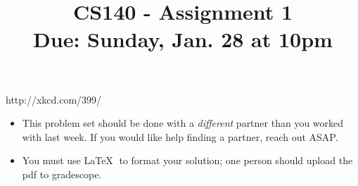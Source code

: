 \documentclass[11pt]{article}
\title{CS140 - Assignment 1\\\small{Due: Sunday,  Jan. 28 at  10pm}}
\author{}
\date{}
\begin{document}
\maketitle

\begin{center}

\footnotesize{http://xkcd.com/399/}
\end{center}


\begin{itemize}
\item[] This problem set should be done with a \emph{different} partner than you worked with last week.  If you would like help finding a partner, reach out ASAP.
\item[] You must use \LaTeX $\;$ to format your solution; one person should upload the pdf to gradescope.
\end{itemize}
\end{document}
